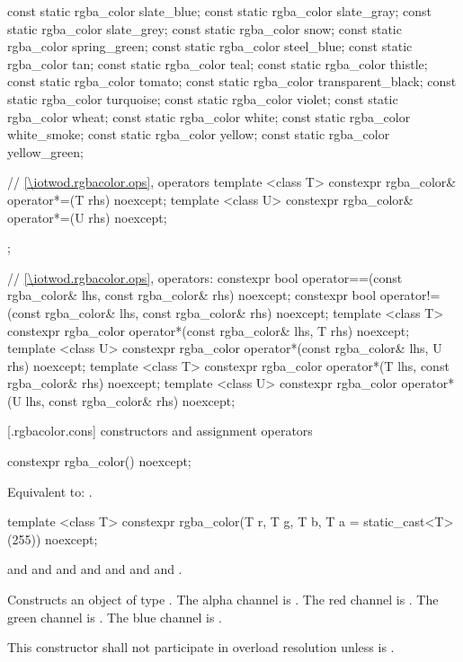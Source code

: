 \begin{codeblock}
{{    const static rgba_color slate_blue;
    const static rgba_color slate_gray;
    const static rgba_color slate_grey;
    const static rgba_color snow;
    const static rgba_color spring_green;
    const static rgba_color steel_blue;
    const static rgba_color tan;
    const static rgba_color teal;
    const static rgba_color thistle;
    const static rgba_color tomato;
    const static rgba_color transparent_black;
    const static rgba_color turquoise;
    const static rgba_color violet;
    const static rgba_color wheat;
    const static rgba_color white;
    const static rgba_color white_smoke;
    const static rgba_color yellow;
    const static rgba_color yellow_green;
    
    // \ref{\iotwod.rgbacolor.ops}, operators
    template <class T>
    constexpr rgba_color& operator*=(T rhs) noexcept;
    template <class U>
    constexpr rgba_color& operator*=(U rhs) noexcept;
  };

  // \ref{\iotwod.rgbacolor.ops}, operators:
  constexpr bool operator==(const rgba_color& lhs, const rgba_color& rhs) 
    noexcept;
  constexpr bool operator!=(const rgba_color& lhs, const rgba_color& rhs) 
    noexcept;
  template <class T>
  constexpr rgba_color operator*(const rgba_color& lhs, T rhs) noexcept;
  template <class U>
  constexpr rgba_color operator*(const rgba_color& lhs, U rhs) noexcept;
  template <class T>
  constexpr rgba_color operator*(T lhs, const rgba_color& rhs) noexcept;
  template <class U>
  constexpr rgba_color operator*(U lhs, const rgba_color& rhs) noexcept;
}
\end{codeblock}

 [\iotwod.rgbacolor.cons] { constructors and assignment operators}

%
\begin{itemdecl}
constexpr rgba_color() noexcept;
\end{itemdecl}
\begin{itemdescr}
\pnum
\effects
Equivalent to: .
\end{itemdescr}

%
\begin{itemdecl}
template <class T>
constexpr rgba_color(T r, T g, T b, T a = static_cast<T>(255)) noexcept;
\end{itemdecl}
\begin{itemdescr}
\pnum
\requires
{} and  and  and  and  and  and  and .

\pnum
\effects
Constructs an object of type . The alpha channel is . The red channel is . The green channel is . The blue channel is .

\pnum
\remarks
This constructor shall not participate in overload resolution unless  is .
\end{itemdescr}

